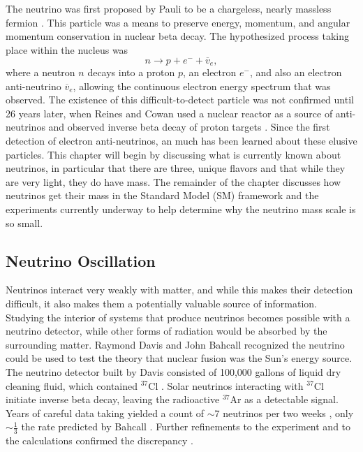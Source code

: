 The neutrino was first proposed by Pauli to be a chargeless, nearly massless fermion \citep{Pauli}.  This particle was a means to preserve energy, momentum, and angular momentum conservation in nuclear beta decay.  The hypothesized process taking place within the nucleus was
\begin{equation}
n \rightarrow p + e^- + \overline{v}_e,
\end{equation}
where a neutron $n$ decays into a proton $p$, an electron $e^-$, and also an electron anti-neutrino $\overline{v}_e$, allowing the continuous electron energy spectrum that was observed. The existence of this difficult-to-detect particle was not confirmed until 26 years later, when Reines and Cowan used a nuclear reactor as a source of anti-neutrinos and observed inverse beta decay of proton targets \citep{poltergeist}.  Since the first detection of electron anti-neutrinos, an much has been learned about these elusive particles.  This chapter will begin by discussing what is currently known about neutrinos, in particular that there are three, unique flavors and that while they are very light, they do have mass.  The remainder of the chapter discusses how neutrinos get their mass in the Standard Model (SM) framework and the experiments currently underway to help determine why the neutrino mass scale is so small.

\subsection{Neutrino Oscillation}
Neutrinos interact very weakly with matter, and while this makes their detection difficult, it also makes them a potentially valuable source of information.  Studying the interior of systems that produce neutrinos becomes possible with a neutrino detector, while other forms of radiation would be absorbed by the surrounding matter.  Raymond Davis and John Bahcall recognized the neutrino could be used to test the theory that nuclear fusion was the Sun's energy source.  The neutrino detector built by Davis consisted of 100,000 gallons of liquid dry cleaning fluid, which contained $^{37}$Cl \citep{DavisInitial}.  Solar neutrinos interacting with $^{37}$Cl initiate inverse beta decay, leaving the radioactive $^{37}$Ar as a detectable signal.  Years of careful data taking yielded a count of $\sim$7 neutrinos per two weeks \citep{DavisInitial}, only $\sim\frac{1}{3}$ the rate predicted by Bahcall \citep{BahcallSun}.  Further refinements to the experiment and to the calculations confirmed the discrepancy \citep{Davis}.

